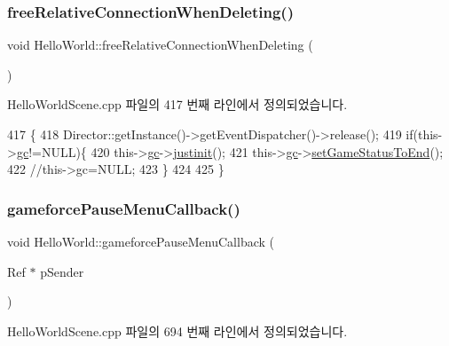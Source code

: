 \subsubsection{\texorpdfstring{free\+Relative\+Connection\+When\+Deleting()}{freeRelativeConnectionWhenDeleting()}}
{\footnotesize\ttfamily void Hello\+World\+::free\+Relative\+Connection\+When\+Deleting (\begin{DoxyParamCaption}{ }\end{DoxyParamCaption})\hspace{0.3cm}{\ttfamily [protected]}}



Hello\+World\+Scene.\+cpp 파일의 417 번째 라인에서 정의되었습니다.


\begin{DoxyCode}
417                                                    \{
418     Director::getInstance()->getEventDispatcher()->release();
419     \textcolor{keywordflow}{if}(this->\hyperlink{class_hello_world_a547cb213126911d9a7151f8259dc7102}{gc}!=NULL)\{
420         this->\hyperlink{class_hello_world_a547cb213126911d9a7151f8259dc7102}{gc}->\hyperlink{class_tetris_1_1_game_controller_aef406397d4719c9edd49774d0343ce05}{justinit}();
421         this->\hyperlink{class_hello_world_a547cb213126911d9a7151f8259dc7102}{gc}->\hyperlink{class_tetris_1_1_game_controller_a3c5e6034b2e2faf70371a13eb5f9c5bb}{setGameStatusToEnd}();
422         \textcolor{comment}{//this->gc=NULL;}
423     \}
424     
425 \}
\end{DoxyCode}
\mbox{\label{class_hello_world_ac202dde4f557f0b9b6c3d150da4eec65}} 
\subsubsection{\texorpdfstring{gameforce\+Pause\+Menu\+Callback()}{gameforcePauseMenuCallback()}}
{\footnotesize\ttfamily void Hello\+World\+::gameforce\+Pause\+Menu\+Callback (\begin{DoxyParamCaption}\item[{Ref $\ast$}]{p\+Sender }\end{DoxyParamCaption})}



Hello\+World\+Scene.\+cpp 파일의 694 번째 라인에서 정의되었습니다.


